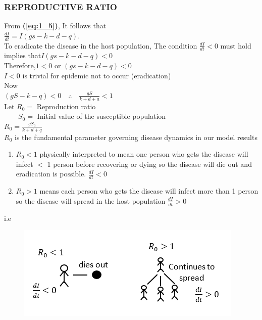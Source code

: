 \documentclass[12pt]{report}
\newcommand{\spn}[1]{\\[#1cm]}
\newcommand{\refn}[1]{\textbf{(\ref{#1})}}
\newcommand{\dsp}{\displaystyle}
\begin{document}
	 \subsubsection{REPRODUCTIVE RATIO}
	 From \refn{eq:1_5}, It follows that \\
	 $\frac{dI}{dt}=I(gs-k-d-q).$ \\
	 To eradicate the disease in the host population, The condition $\frac{dI}{dt}<0$ must hold implies that\quad $I(gs-k-d-q)<0$ \\
	 Therefore,\quad $ 1<0$ or $(gs-k-d-q)<0 $\\
	 $I<0$ is trivial for epidemic not to occur (eradication)\\
	 Now\\
	 $\dsp(gS-k-q) < 0 \quad \therefore\quad \frac{gS}{k+d+a} < 1$\spn{0.6}
	 Let $R_0 =$ Reproduction ratio\\
	 $\left.\right.\qquad S_0 =$ Initial value of the susceptible population\spn{0.5}
	 $\dsp R_0 =\frac{gS_0}{k+d+q}$\spn{0.7}
	 $R_0$ is the fundamental parameter governing disease dynamics in our model results
	 \begin{enumerate}
	 	\item $R_0 < 1$ physically interpreted to mean one person who gets the disease will infect $<$ 1 person before recovering or dying so the disease will die out and eradication is possible. $\dsp \frac{dI}{dt} < 0$\\
	 	
	 	\item $R_0 > 1$ means each person who gets the disease will infect more than 1 person so the disease will spread in the host population $\dsp \frac{dI}{dt} > 0$\\
	 \end{enumerate}
	  i.e
	  \begin{center}
	  	\begin{figure}[h!]
	  		\includegraphics[]{d_c.png}
	  	\end{figure}
	  \end{center}
  
\end{document}
